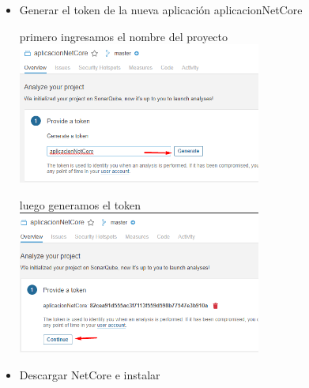 \documentclass[preprint,12pt]{elsarticle}
\begin{document}
\begin{itemize}
	\item Generar el token de la nueva aplicación aplicacionNetCore
	\begin{center}
		primero ingresamos el nombre del proyecto \\
		\includegraphics[width=8cm]{./imagen/generartoken}
	\end{center}
\begin{center}
	luego generamos el token \\
	\includegraphics[width=8cm]{./imagen/tokengenerado}
\end{center}
	\item Descargar NetCore e instalar


\end{itemize}
\end{document}
